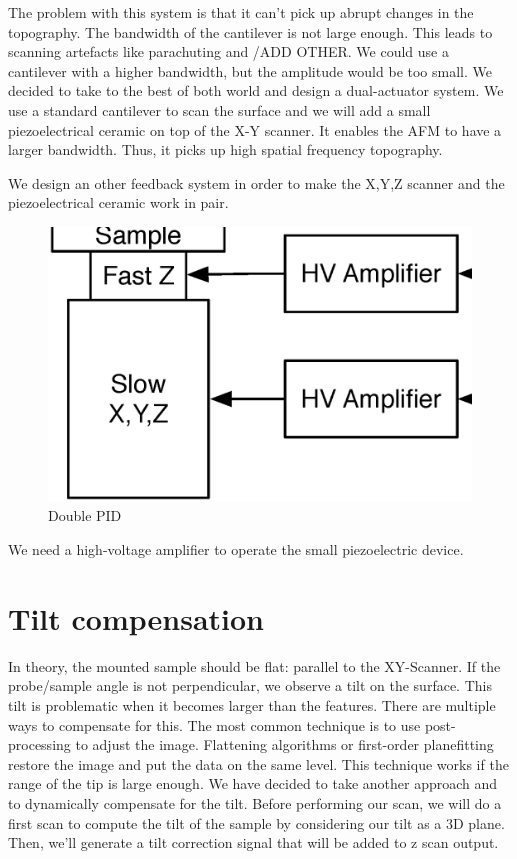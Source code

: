 The problem with this system is that it can't pick up abrupt changes in the topography.\cite{jeong:093706} The bandwidth of the cantilever is not large enough. This leads to scanning artefacts like parachuting and /ADD OTHER. We could use a cantilever with a higher bandwidth, but the amplitude would be too small. We decided to take to the best of both world and design a dual-actuator system. We use a standard cantilever to scan the surface and we will add a small piezoelectrical ceramic on top of the X-Y scanner. It enables the AFM to have a larger bandwidth. Thus, it picks up high spatial frequency topography. 

We design an other feedback system in order to make the X,Y,Z scanner and the piezoelectrical ceramic work in pair.

\begin{figure}[H]
  \centering
  \includegraphics[scale=0.3]{images/doublePID.eps}
    \caption{Double PID}
  \label{DoublePid}
\end{figure}

We need a high-voltage amplifier to operate the small piezoelectric device. 

\section{Tilt compensation}


In theory, the mounted sample should be flat: parallel to the XY-Scanner. If the probe/sample angle is not perpendicular, we observe a tilt on the surface. This tilt is problematic when it becomes larger than the features. There are multiple ways to compensate for this. The most common technique is to use post-processing to adjust the image. Flattening algorithms or first-order planefitting restore the image and put the data on the same level. This technique works if the range of the tip is large enough. We have decided to take another approach and to dynamically compensate for the tilt. Before performing our scan, we will do a first scan to compute the tilt of the sample by considering our tilt as a 3D plane. Then, we'll generate a tilt correction signal that will be added to z scan output.


